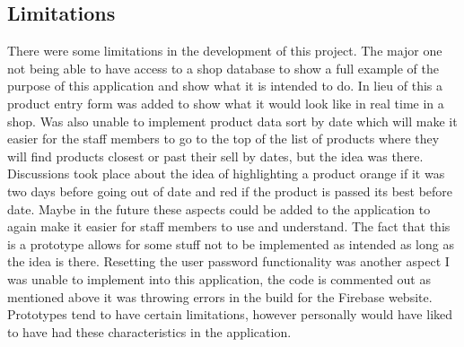 \subsection{Limitations}
There were some limitations in the development of this project. The major one not being able to have access to a shop database to show a full example of the purpose of this application and show what it is intended to do. In lieu of this a product entry form was added to show what it would look like in real time in a shop. Was also unable to implement product data sort by date which will make it easier for the staff members to go to the top of the list of products where they will find products closest or past their sell by dates, but the idea was there. Discussions took place about the idea of highlighting a product orange if it was two days before going out of date and red if the product is passed its best before date. Maybe in the future these aspects could be added to the application to again make it easier for staff members to use and understand. The fact that this is a prototype allows for some stuff not to be implemented as intended as long as the idea is there. Resetting the user password functionality was another aspect I was unable to implement into this application, the code is commented out as mentioned above it was throwing errors in the build for the Firebase website. Prototypes tend to have certain limitations, however personally would have liked to have had these characteristics in the application.
